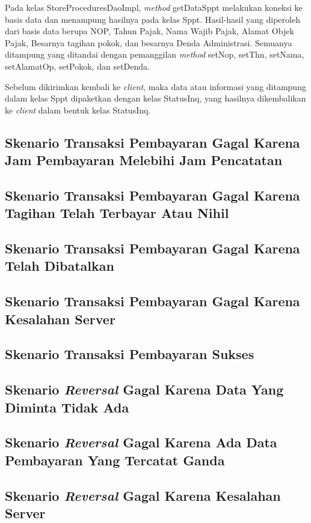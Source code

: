   Pada kelas StoreProceduresDaoImpl, \textit{method} getDataSppt melakukan koneksi ke basis data dan menampung hasilnya pada kelas Sppt. Hasil-hasil yang diperoleh dari basis data berupa NOP, Tahun Pajak, Nama Wajib Pajak, Alamat Objek Pajak, Besarnya tagihan pokok, dan besarnya Denda Administrasi. Semuanya ditampung yang ditandai dengan pemanggilan \textit{method} setNop, setThn, setNama, setAlamatOp, setPokok, dan setDenda.
  
  Sebelum dikirimkan kembali ke \textit{client}, maka data atau informasi yang ditampung dalam kelas Sppt dipaketkan dengan kelas StatusInq, yang hasilnya dikembalikan ke \textit{client} dalam bentuk kelas StatusInq.

\subsection{Skenario Transaksi Pembayaran Gagal Karena Jam Pembayaran Melebihi Jam Pencatatan}
\subsection{Skenario Transaksi Pembayaran Gagal Karena Tagihan Telah Terbayar Atau Nihil}
\subsection{Skenario Transaksi Pembayaran Gagal Karena Telah Dibatalkan}
\subsection{Skenario Transaksi Pembayaran Gagal Karena Kesalahan Server}
\subsection{Skenario Transaksi Pembayaran Sukses}
\subsection{Skenario \textit{Reversal} Gagal Karena Data Yang Diminta Tidak Ada}
\subsection{Skenario \textit{Reversal} Gagal Karena Ada Data Pembayaran Yang Tercatat Ganda}
\subsection{Skenario \textit{Reversal} Gagal Karena Kesalahan Server}
